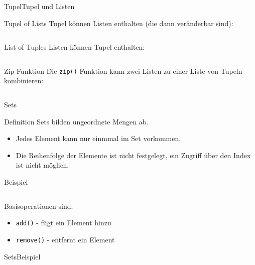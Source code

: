 \documentclass[xelatex,aspectratio=169]{beamer}
\begin{document}
\begin{frame}{Tupel}{Tupel und Listen}
    \begin{block}{Tupel of Lists}
        Tupel können Listen enthalten (die dann veränderbar sind):
        \inputminted[lastline=1]{python}{src/tupel_und_listen.py}
    \end{block}
    \begin{block}{List of Tuples}
        Listen können Tupel enthalten:
        \inputminted[firstline=4,lastline=4]{python}{src/tupel_und_listen.py}
    \end{block}
    \begin{block}{Zip-Funktion}
        Die \texttt{zip()}-Funktion kann zwei Listen zu einer Liste von Tupeln kombinieren:
        \inputminted[firstline=7,lastline=7]{python}{src/tupel_und_listen.py}
    \end{block}
\end{frame}

\begin{frame}{Sets}
    \begin{block}{Definition}
        Sets bilden ungeordnete Mengen ab.
        \begin{itemize}
            \item Jedes Element kann nur einmmal im Set vorkommen.
            \item Die Reihenfolge der Elemente ist nicht festgelegt, ein Zugriff über den Index ist nicht möglich.
        \end{itemize}

    \end{block}
    \begin{exampleblock}{Beispiel}
        \inputminted{python}{src/sets_overview.py}
    \end{exampleblock}

    Basisoperationen sind:
    \begin{itemize}
        \item \texttt{add()} - fügt ein Element hinzu
        \item \texttt{remove()} - entfernt ein Element
    \end{itemize}

\end{frame}

\begin{frame}{Sets}{Beispiel}
    \inputminted{python}{src/sets_example.py}
\end{frame}
\end{document}
